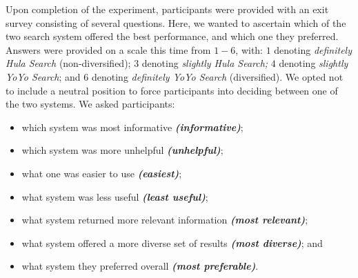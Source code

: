 Upon completion of the experiment, participants were provided with an exit survey consisting of several questions. Here, we wanted to ascertain which of the two search system offered the best performance, and which one they preferred. Answers were provided on a scale this time from $1-6$, with: $1$ denoting \emph{definitely Hula Search} (non-diversified); $3$ denoting \emph{slightly Hula Search;} $4$ denoting \emph{slightly YoYo Search}; and $6$ denoting \emph{definitely YoYo Search} (diversified). We opted not to include a neutral position to force participants into deciding between one of the two systems. We asked participants:

\begin{itemize}
    \item{which system was most informative \emph{\textbf{(informative)}};}
    \item{which system was more unhelpful \emph{\textbf{(unhelpful)}};}
    \item{what one was easier to use \emph{\textbf{(easiest)}};}
    \item{what system was less useful \emph{\textbf{(least useful)}};}
    \item{what system returned more relevant information \emph{\textbf{(most relevant)}};}
    \item{what system offered a more diverse set of results \emph{\textbf{(most diverse)}}; and}
    \item{what system they preferred overall \emph{\textbf{(most preferable)}}.}
\end{itemize}


